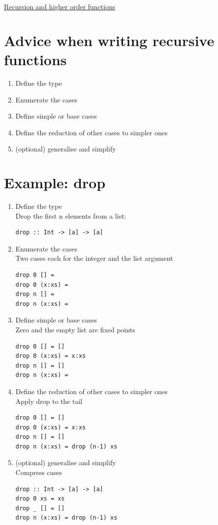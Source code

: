 \documentclass{article}[18pt]
\begin{document}
\begin{center}
\underline{\huge Recursion and higher order functions}
\end{center}
\section{Advice when writing recursive functions}
\begin{enumerate}
	\item Define the type
	\item Enumerate the cases
	\item Define simple or base cases
	\item Define the reduction of other cases to simpler ones
	\item (optional) generalise and simplify
\end{enumerate}
\section{Example: drop}
\begin{enumerate}
	\item Define the type\\
Drop the first n elements from a list:
\begin{verbatim}
drop :: Int -> [a] -> [a]
\end{verbatim}
	\item Enumerate the cases\\
Two cases each for the integer and the list argument
\begin{verbatim}
drop 0 [] =
drop 0 (x:xs) = 
drop n [] = 
drop n (x:xs) = 
\end{verbatim}
	\item Define simple or base cases\\
Zero and the empty list are fixed points
\begin{verbatim}
drop 0 [] = []
drop 0 (x:xs) = x:xs
drop n [] = []
drop n (x:xs) = 
\end{verbatim}
	\item Define the reduction of other cases to simpler ones\\
Apply drop to the tail
\begin{verbatim}
drop 0 [] = []
drop 0 (x:xs) = x:xs
drop n [] = []
drop n (x:xs) = drop (n-1) xs
\end{verbatim}
	\item (optional) generalise and simplify\\
Compress cases
\begin{verbatim}
drop :: Int -> [a] -> [a]
drop 0 xs = xs
drop _ [] = []
drop n (x:xs) = drop (n-1) xs
\end{verbatim}
\end{enumerate}
\end{document}
